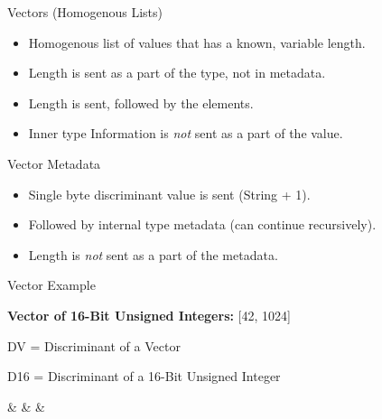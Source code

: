 \documentclass{beamer}
\newcommand{\rot}[1]{\rotatebox{90}{#1}}
\begin{document}
\begin{frame}{Vectors (Homogenous Lists)}
	\begin{itemize}
		\item Homogenous list of values that has a known, variable length.
		\item Length is sent as a part of the type, not in metadata.
		\item Length is sent, followed by the elements.
		\item Inner type Information is \emph{not} sent as a part of the value.
	\end{itemize}
\end{frame}

\begin{frame}{Vector Metadata}
	\begin{itemize}
		\item Single byte discriminant value is sent (String + 1).
		\item Followed by internal type metadata (can continue recursively).
		\item Length is \emph{not} sent as a part of the metadata.
	\end{itemize}
\end{frame}

\begin{frame}[fragile]{Vector Example}
	\begin{center}
		\textbf{Vector of 16-Bit Unsigned Integers:} [42, 1024]

		DV = Discriminant of a Vector

		D16 = Discriminant of a 16-Bit Unsigned Integer

		\begin{bytefield}{26}
			\bitbox{2}{\rot{DV}} & \bitbox{2}{\rot{D16}} &  &  \\
		\end{bytefield}
	\end{center}
\end{frame}
\end{document}
